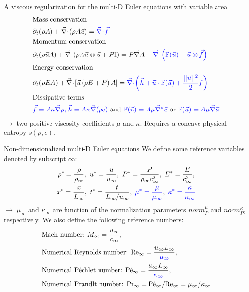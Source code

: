 \documentclass[xcolor=dvipsnames,10pt]{beamer}
\renewcommand{\Re}{\textrm{Re}}
\newcommand{\Pe}{\textrm{P\'e}}
\renewcommand{\Pr}{\textrm{Pr}}
\renewcommand{\div}{\vec{\nabla}\! \cdot \!}
\newcommand{\grad}{\vec{\nabla}}
\begin{document}
\begin{frame}{A viscous regularization for the multi-D Euler equations with variable area}
\begin{align}
&\text{Mass conservation} \nonumber \\
&\partial_t ( \rho A ) + \div \left( \rho A \vec{u} \right) = \textcolor{blue}{\div \vec{f}} \nonumber \\
&\text{Momentum conservation} \nonumber \\
&\partial_t ( \rho \vec{u} A ) + \div \left( \rho A \vec{u} \otimes \vec{u} + P \mathbb{I} \right) = P \grad A + \textcolor{blue}{\div \left( \mathbb{F}(\vec{u}) + \vec{u} \otimes \vec{f} \right)} \nonumber \\
&\text{Energy conservation} \nonumber \\
&\partial_t ( \rho E A ) + \div \left[ \vec{u} \left( \rho E + P \right) A \right] = \textcolor{blue}{\div \left( \vec{h} + \vec{u}\cdot \mathbb{F}(\vec{u}) + \frac{|| \vec{u} ||^2}{2} f \right)} \nonumber \\
&\text{Dissipative terms} \nonumber \\
& \textcolor{blue}{\vec{f} = A \kappa \grad \rho \text{, } \vec{h} = A \kappa \grad ( \rho e) } \nonumber
\text{ and } \textcolor{blue}{\mathbb{F}(\vec{u}) = A \mu \grad^s \vec{u}} \text{ or } \textcolor{blue}{\mathbb{F}(\vec{u}) = A \mu \grad \vec{u}}
\end{align}
$\to$ two positive viscosity coefficients $\mu$ and $\kappa$. Requires a concave physical entropy $s(\rho,e)$.
\end{frame}
\begin{frame}{Non-dimensionalized multi-D Euler equations}
We define some reference variables denoted by subscript $\infty$:
\begin{multline}
\rho^*   = \frac{\rho}{\rho_\infty}           ,\
u^*      = \frac{u}{u_\infty}                 ,\
P^*      = \frac{P}{\rho_\infty c^2_\infty}   ,\
E^*      = \frac{E}{c^2_\infty }              ,\\
x^* = \frac{x}{L_\infty}                      ,\
t^* = \frac{t}{L_\infty / u_\infty}           ,\ 
\textcolor{blue}{\mu^*    = \frac{\mu}{\mu_\infty}}             ,\
\textcolor{blue}{\kappa^* = \frac{\kappa}{\kappa_\infty}}     \nonumber
\end{multline}
$\to$ $\mu_\infty$ and $\kappa_\infty$ are function of the normalization parameters $norm_P^\mu$ and $norm_P^\kappa$, respectively.
We also define the following reference numbers:
\begin{align}
&\text{Mach number: }M_\infty = \frac{u_\infty}{c_\infty}, \nonumber\\
&\text{Numerical Reynolds number: }\Re_\infty = \frac{u_\infty L_\infty}{\textcolor{blue}{\mu_\infty}} , \nonumber \\
&\text{Numerical P\'echlet number: }\Pe_\infty = \frac{u_\infty L_\infty}{\textcolor{blue}{\kappa_\infty}} , \nonumber \\
&\text{Numerical Prandlt number: }\Pr_\infty = \Pe_\infty / \Re_\infty = \mu_\infty / \kappa_\infty \nonumber \nonumber
\end{align}
\end{frame}
\end{document}

